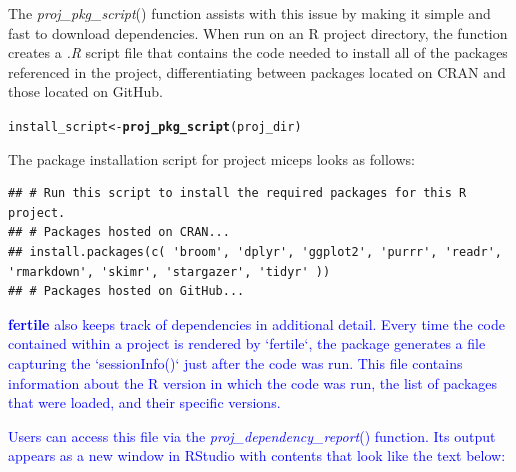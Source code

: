 \documentclass[APA,LATO1COL]{WileyNJD-v2}\usepackage[]{graphicx}\usepackage[]{color}
\makeatletter
\newcommand{\hlstd}[1]{\textcolor[rgb]{0.345,0.345,0.345}{#1}}%
\newcommand{\hlkwb}[1]{\textcolor[rgb]{0.69,0.353,0.396}{#1}}%
\newcommand{\hlkwd}[1]{\textcolor[rgb]{0.737,0.353,0.396}{\textbf{#1}}}%
\newenvironment{kframe}{%
 \def\at@end@of@kframe{}%
 \ifinner\ifhmode%
  \def\at@end@of@kframe{\end{minipage}}%
  \begin{minipage}{\columnwidth}%
 \fi\fi%
 \def\FrameCommand##1{\hskip\@totalleftmargin \hskip-\fboxsep
 \colorbox{shadecolor}{##1}\hskip-\fboxsep
     \hskip-\linewidth \hskip-\@totalleftmargin \hskip\columnwidth}%
 \MakeFramed {\advance\hsize-\width
   \@totalleftmargin\z@ \linewidth\hsize
   \@setminipage}}%
 {\par\unskip\endMakeFramed%
 \at@end@of@kframe}
\newenvironment{knitrout}{}{} %
\newcommand{\R}{\textsf{R}\xspace}
\newcommand{\cmd}[1]{\textit{#1}}
\newcommand{\pkg}[1]{\textbf{#1}}
\newcommand{\func}[1]{\textit{#1}()}
\makeatother
\begin{document}
The \func{proj\_pkg\_script} function assists with this issue by making it simple and fast to download dependencies. When run on an \R project directory, the function creates a \cmd{.R} script file that contains the code needed to install all of the packages referenced in the project, differentiating between packages located on CRAN and those located on GitHub.
\begin{knitrout}
\color{fgcolor}\begin{kframe}
\begin{alltt}
\hlstd{install_script} \hlkwb{<-} \hlkwd{proj_pkg_script}\hlstd{(proj_dir)}
\end{alltt}
\end{kframe}
\end{knitrout}

The package installation script for project miceps looks as follows:

\begin{knitrout}
\color{fgcolor}\begin{kframe}
\begin{verbatim}
## # Run this script to install the required packages for this R project.
## # Packages hosted on CRAN...
## install.packages(c( 'broom', 'dplyr', 'ggplot2', 'purrr', 'readr', 'rmarkdown', 'skimr', 'stargazer', 'tidyr' ))
## # Packages hosted on GitHub...
\end{verbatim}
\end{kframe}
\end{knitrout}

\textcolor{blue}{\pkg{fertile} also keeps track of dependencies in additional detail. Every time the code contained within a project is rendered by `fertile`, the package generates a file capturing the `sessionInfo()` just after the code was run. This file contains information about the R version in which the code was run, the list of packages that were loaded, and their specific versions.}

\textcolor{blue}{Users can access this file via the \func{proj\_dependency\_report} function. Its output appears as a new window in RStudio with contents that look like the text below:}
\end{document}
